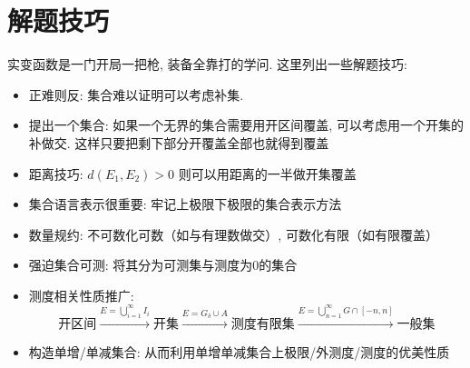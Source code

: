 \section{解题技巧}
实变函数是一门开局一把枪, 装备全靠打的学问. 这里列出一些解题技巧:
\begin{itemize}
    \item 正难则反: 集合难以证明可以考虑补集.
    \item 提出一个集合: 如果一个无界的集合需要用开区间覆盖, 可以考虑用一个开集的补做交.
        这样只要把剩下部分开覆盖全部也就得到覆盖
    \item 距离技巧: \(d(E_{1},E_{2})>0\) 则可以用距离的一半做开集覆盖
    \item 集合语言表示很重要: 牢记上极限下极限的集合表示方法
    \item 数量规约: 不可数化可数（如与有理数做交）, 可数化有限（如有限覆盖）
    \item 强迫集合可测: 将其分为可测集与测度为0的集合
    \item 测度相关性质推广: \[
            \text{开区间}
            \xrightarrow{E=\bigcup_{i=1}^{\infty} I_{i}}
            \text{开集} \xrightarrow{E=G_{\delta} \cup A}
            \text{测度有限集}
            \xrightarrow{E=\bigcup_{n=1}^{\infty} G\cap
            [-n,n]} \text{一般集}
        \]
    \item 构造单增/单减集合: 从而利用单增单减集合上极限/外测度/测度的优美性质
\end{itemize}